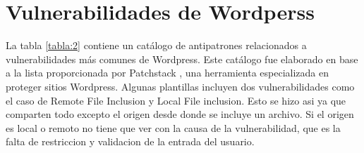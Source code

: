 \section{Vulnerabilidades de Wordperss}

La tabla \ref{tabla:2} contiene un catálogo de antipatrones relacionados a vulnerabilidades más comunes de Wordpress. Este catálogo fue elaborado en base a la lista proporcionada por Patchstack\cite{Patchstack} , una herramienta especializada en proteger sitios Wordpress. Algunas plantillas incluyen dos vulnerabilidades como el caso de Remote File Inclusion y Local File inclusion. Esto se hizo asi ya que comparten todo excepto el origen desde donde se incluye un archivo. Si el origen es local o remoto no tiene que ver con la causa de la vulnerabilidad, que es la falta de restriccion y validacion de la entrada del usuario.


\newpage


